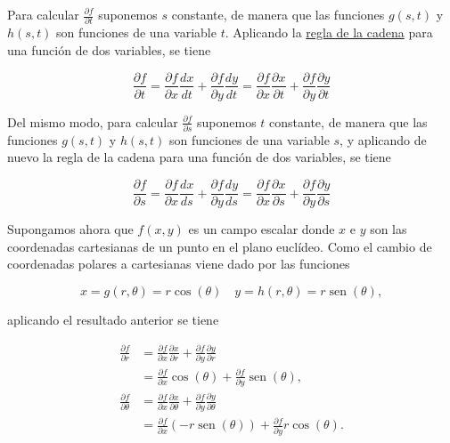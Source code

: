 \documentclass[
  spanish,
  a4paper,
]{scrreport}
\theoremstyle{definition}
\theoremstyle{remark}
\begin{document}
\begin{tcolorbox}[enhanced jigsaw, arc=.35mm, bottomrule=.15mm, bottomtitle=1mm, breakable, colback=white, colbacktitle=quarto-callout-tip-color!10!white, colframe=quarto-callout-tip-color-frame, coltitle=black, left=2mm, leftrule=.75mm, opacityback=0, opacitybacktitle=0.6, rightrule=.15mm, title=\textcolor{quarto-callout-tip-color}{\faLightbulb}\hspace{0.5em}{Solución}, titlerule=0mm, toprule=.15mm, toptitle=1mm]

Para calcular \(\frac{\partial f}{\partial t}\) suponemos \(s\)
constante, de manera que las funciones \(g(s,t)\) y \(h(s,t)\) son
funciones de una variable \(t\). Aplicando la
\href{https://aprendeconalf.es/analisis-manual/13-derivadas-funciones-varias-variables.html\#regla-de-la-cadena}{regla
de la cadena} para una función de dos variables, se tiene

\[
\frac{\partial f}{\partial t} 
= \frac{\partial f}{\partial x}\frac{dx}{dt} + \frac{\partial f}{\partial y}\frac{dy}{dt} 
= \frac{\partial f}{\partial x}\frac{\partial x}{\partial t} + \frac{\partial f}{\partial y}\frac{\partial y}{\partial t}
\]

Del mismo modo, para calcular \(\frac{\partial f}{\partial s}\)
suponemos \(t\) constante, de manera que las funciones \(g(s,t)\) y
\(h(s,t)\) son funciones de una variable \(s\), y aplicando de nuevo la
regla de la cadena para una función de dos variables, se tiene

\[
\frac{\partial f}{\partial s} 
= \frac{\partial f}{\partial x}\frac{dx}{ds} + \frac{\partial f}{\partial y}\frac{dy}{ds} 
= \frac{\partial f}{\partial x}\frac{\partial x}{\partial s} + \frac{\partial f}{\partial y}\frac{\partial y}{\partial s}
\]

Supongamos ahora que \(f(x,y)\) es un campo escalar donde \(x\) e \(y\)
son las coordenadas cartesianas de un punto en el plano euclídeo. Como
el cambio de coordenadas polares a cartesianas viene dado por las
funciones

\[
x = g(r,\theta) = r\cos(\theta) \quad y = h(r,\theta) = r\operatorname{sen}(\theta),
\]

aplicando el resultado anterior se tiene

\begin{align*}
\frac{\partial f}{\partial r} 
&= \frac{\partial f}{\partial x}\frac{\partial x}{\partial r} + \frac{\partial f}{\partial y}\frac{\partial y}{\partial r} \\
&= \frac{\partial f}{\partial x}\cos(\theta) + \frac{\partial f}{\partial y}\operatorname{sen}(\theta), \\
\frac{\partial f}{\partial \theta} 
&= \frac{\partial f}{\partial x}\frac{\partial x}{\partial \theta} + \frac{\partial f}{\partial y}\frac{\partial y}{\partial \theta} \\
&= \frac{\partial f}{\partial x}(-r\operatorname{sen}(\theta)) + \frac{\partial f}{\partial y}r\cos(\theta).
\end{align*}

\end{tcolorbox}
\end{document}
